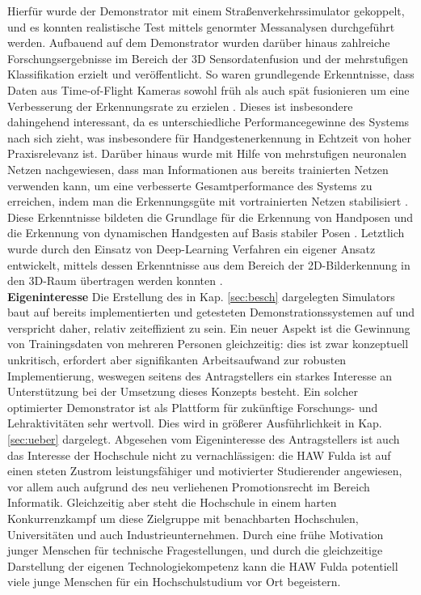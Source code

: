 \documentclass[11pt]{article}
\begin{document}
%
Hierfür wurde der Demonstrator mit einem Straßenverkehrssimulator gekoppelt, und es konnten realistische Test mittels genormter Messanalysen durchgeführt werden. Aufbauend auf dem Demonstrator wurden darüber hinaus zahlreiche Forschungsergebnisse im Bereich der 3D Sensordatenfusion und der mehrstufigen Klassifikation erzielt und veröffentlicht. So waren grundlegende Erkenntnisse, dass Daten aus Time-of-Flight Kameras sowohl früh als auch spät fusionieren um eine Verbesserung der Erkennungsrate zu erzielen \cite{kopinskineural}. Dieses ist insbesondere dahingehend interessant, da es unterschiedliche Performancegewinne des Systems nach sich zieht, was insbesondere für Handgestenerkennung in Echtzeit von hoher Praxisrelevanz ist. Darüber hinaus wurde mit Hilfe von mehrstufigen neuronalen Netzen nachgewiesen, dass man Informationen aus bereits trainierten Netzen verwenden kann, um eine verbesserte Gesamtperformance des Systems zu erreichen, indem man die Erkennungsgüte mit vortrainierten Netzen stabilisiert \cite{kopinski2015pragmatic}. Diese Erkenntnisse bildeten die Grundlage für die Erkennung von Handposen und die Erkennung von dynamischen Handgesten auf Basis stabiler Posen \cite{kopinski2015real}. Letztlich wurde durch den Einsatz von Deep-Learning Verfahren ein eigener Ansatz entwickelt, mittels dessen Erkenntnisse aus dem Bereich der 2D-Bilderkennung in den 3D-Raum übertragen werden konnten \cite{kopinski2016x3,gepperth2017d}.\\

\textbf {Eigeninteresse} Die Erstellung des in Kap. \ref{sec:besch} dargelegten Simulators baut auf bereits implementierten und getesteten Demonstrationssystemen auf und verspricht daher, relativ zeiteffizient zu sein. Ein neuer Aspekt ist die Gewinnung von Trainingsdaten von mehreren Personen gleichzeitig: dies ist zwar konzeptuell unkritisch, erfordert aber signifikanten Arbeitsaufwand zur robusten Implementierung, weswegen seitens des Antragstellers ein starkes Interesse an Unterstützung bei der Umsetzung dieses Konzepts besteht. Ein solcher optimierter Demonstrator ist als Plattform für zukünftige Forschungs- und Lehraktivitäten sehr wertvoll. Dies wird in größerer Ausführlichkeit in Kap. \ref{sec:ueber} dargelegt. Abgesehen vom Eigeninteresse des Antragstellers ist auch das Interesse der Hochschule nicht zu vernachlässigen: die HAW Fulda ist auf einen steten Zustrom leistungsfähiger und motivierter Studierender angewiesen, vor allem auch aufgrund des neu verliehenen Promotionsrecht im Bereich Informatik. Gleichzeitig aber steht die Hochschule in einem harten Konkurrenzkampf um diese Zielgruppe mit benachbarten Hochschulen, Universitäten und auch Industrieunternehmen. Durch eine frühe Motivation junger Menschen für technische Fragestellungen, und durch die gleichzeitige Darstellung der eigenen Technologiekompetenz kann die HAW Fulda potentiell viele junge Menschen für ein Hochschulstudium vor Ort begeistern.
%
\renewcommand{\thesection}{4}
\end{document}
